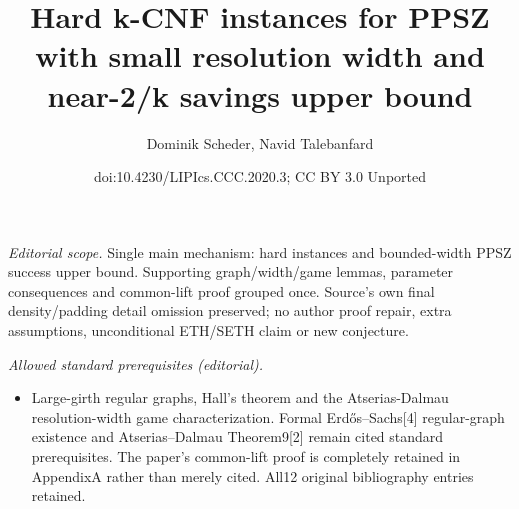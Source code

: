 \documentclass[10pt,a4paper]{article}
\title{Hard k-CNF instances for PPSZ with small resolution width and near-2/k savings upper bound}
\author{Dominik Scheder, Navid Talebanfard}
\date{doi:10.4230/LIPIcs.CCC.2020.3; CC BY 3.0 Unported}
\begin{document}
\maketitle
\noindent\textit{Editorial scope.} Single main mechanism: hard instances and bounded-width PPSZ success upper bound. Supporting graph/width/game lemmas, parameter consequences and common-lift proof grouped once. Source's own final density/padding detail omission preserved; no author proof repair, extra assumptions, unconditional ETH/SETH claim or new conjecture.\par\medskip
\noindent\textit{Allowed standard prerequisites (editorial).}\begin{itemize}
\item Large-girth regular graphs, Hall's theorem and the Atserias-Dalmau resolution-width game characterization. Formal Erdős–Sachs[4] regular-graph existence and Atserias–Dalmau Theorem9[2] remain cited standard prerequisites. The paper's common-lift proof is completely retained in AppendixA rather than merely cited. All12 original bibliography entries retained.
\end{itemize}\medskip
\end{document}

